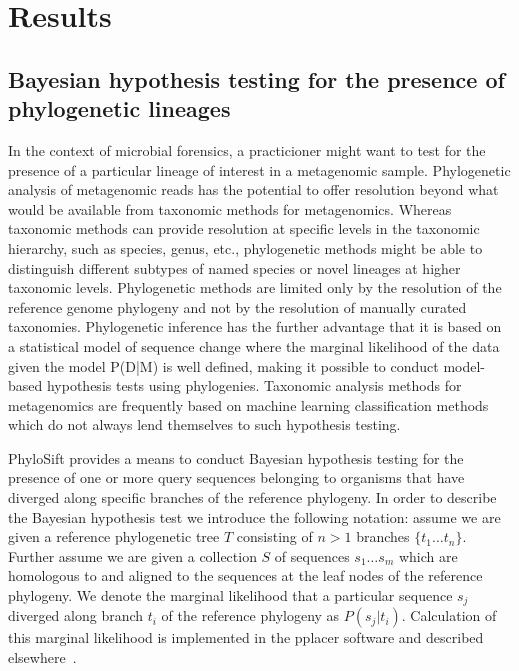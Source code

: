 \documentclass[10pt]{article}
\begin{document}
\section*{Results}

\subsection*{Bayesian hypothesis testing for the presence of phylogenetic lineages}
In the context of microbial forensics, a practicioner might want to test for the presence of a particular lineage of interest in a metagenomic sample. 
Phylogenetic analysis of metagenomic reads has the potential to offer resolution beyond what would be available from taxonomic methods for metagenomics.
Whereas taxonomic methods can provide resolution at specific levels in the taxonomic hierarchy, such as species, genus, etc., phylogenetic methods might be able to distinguish different subtypes of named species or novel lineages at higher taxonomic levels.
Phylogenetic methods are limited only by the resolution of the reference genome phylogeny and not by the resolution of manually curated taxonomies. 
Phylogenetic inference has the further advantage that it is based on a statistical model of sequence change where the marginal likelihood of the data given the model P(D|M) is well defined, making it possible to conduct model-based hypothesis tests using phylogenies.
Taxonomic analysis methods for metagenomics are frequently based on machine learning classification methods which do not always lend themselves to such hypothesis testing.

PhyloSift provides a means to conduct Bayesian hypothesis testing for the presence of one or more query sequences belonging to organisms that have diverged along specific branches of the reference phylogeny.
In order to describe the Bayesian hypothesis test we introduce the following notation: assume we are given a reference phylogenetic tree $T$ consisting of $n > 1$ branches $\{t_1 \dots t_n\}$. 
Further assume we are given a collection $S$ of sequences $s_1 \dots s_m$ which are homologous to and aligned to the sequences at the leaf nodes of the reference phylogeny. 
We denote the marginal likelihood that a particular sequence $s_j$ diverged along branch $t_i$ of the reference phylogeny as $P(s_j|t_i)$.
Calculation of this marginal likelihood is implemented in the pplacer software and described elsewhere~\cite{Matsen2010}.
\end{document}
